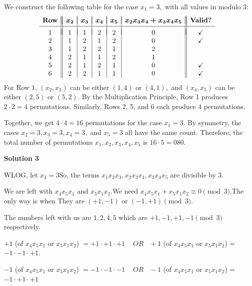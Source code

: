 \begin{enumerate}
\begin{enumerate}
            \end{enumerate}
            We construct the following table for the case $x_1=3,$ with all values in modulo $3:$
 \[\begin{array}{c||c|c|c|c|c||c} & & & & & & \\ [-2.5ex] \textbf{Row} & \boldsymbol{x_2} & \boldsymbol{x_3} & \boldsymbol{x_4} & \boldsymbol{x_5} & \boldsymbol{x_2x_3x_4 + x_3x_4x_5} & \textbf{Valid?} \\ [0.5ex] \hline & & & & & & \\ [-2ex] 1 & 1 & 1 & 2 & 2 & 0 & \checkmark \\ 2 & 1 & 2 & 1 & 2 & 0 & \checkmark \\ 3 & 1 & 2 & 2 & 1 & 2 & \\ 4 & 2 & 1 & 1 & 2 & 1 & \\ 5 & 2 & 1 & 2 & 1 & 0 & \checkmark \\ 6 & 2 & 2 & 1 & 1 & 0 & \checkmark \end{array}\]For Row 1, $(x_2,x_3)$ can be either $(1,4)$ or $(4,1),$ and $(x_4,x_5)$ can be either $(2,5)$ or $(5,2).$ By the Multiplication Principle, Row 1 produces $2\cdot2=4$ permutations. Similarly, Rows 2, 5, and 6 each produce $4$ permutations.

 Together, we get $4\cdot4=16$ permutations for the case $x_1=3.$ By symmetry, the cases $x_2=3, x_3=3, x_4=3,$ and $x_5=3$ all have the same count. Therefore, the total number of permutations $x_1, x_2, x_3, x_4, x_5$ is $16\cdot5=\boxed{080}.$




\textbf{Solution 3}

WLOG, let $x_{3} = 3$So, the terms $x_{1}x_{2}x_{3}, x_{2}x_{3}x_{4},x_{3}x_{4}x_{5}$ are divisible by $3$.

 We are left with $x_{4}x_{5}x_{1}$ and $x_{5}x_{1}x_{2}$.We need $x_{4}x_{5}x_{1} + x_{5}x_{1}x_{2} \equiv 0 \pmod{3}$.The only way is when They are $(+1,-1)$ or $(-1, +1) \pmod{3}$.

 The numbers left with us are $1,2,4,5$ which are $+1,-1,+1,-1\pmod{3}$ respectively.

 $+1$ (of $x_{4}x_{5}x_{1}$ or $x_{5}x_{1}x_{2}$) $= +1 \cdot +1 \cdot +1$ $\;\;\; OR \;\;\;+1$ (of $x_{4}x_{5}x_{1}$ or $x_{5}x_{1}x_{2}$) = $-1 \cdot -1 \cdot +1$.

 $-1$ (of $x_{4}x_{5}x_{1}$ or $x_{5}x_{1}x_{2}$) $= -1 \cdot -1 \cdot -1$ $\;\;\; OR \;\;\;-1$ (of $x_{4}x_{5}x_{1}$ or $x_{5}x_{1}x_{2}$) = $-1 \cdot +1 \cdot +1$


\end{enumerate}
